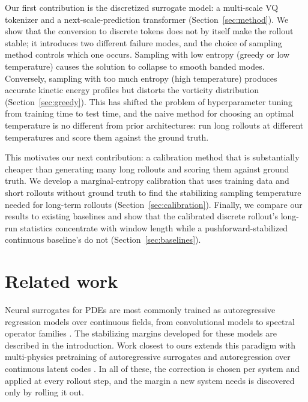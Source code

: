 \documentclass{article}
\begin{document}
Our first contribution is the discretized surrogate model: a multi-scale VQ tokenizer and a next-scale-prediction transformer (Section~\ref{sec:method}).
We show that the conversion to discrete tokens does not by itself make the rollout stable; it introduces two different failure modes, and the choice of sampling method controls which one occurs.
Sampling with low entropy (greedy or low temperature) causes the solution to collapse to smooth banded modes. Conversely, sampling with too much entropy (high temperature) 
produces accurate kinetic energy profiles but distorts the vorticity distribution (Section~\ref{sec:greedy}). This has shifted the problem of hyperparameter tuning from training time to test time, 
and the naive method for choosing an optimal temperature is no different from prior architectures: run long rollouts at different temperatures and score them against the ground truth.

This motivates our next contribution: a calibration method that is substantially cheaper than generating many long rollouts and scoring them against ground truth. We develop 
a marginal-entropy calibration that uses training data and short rollouts without ground truth to find the stabilizing sampling temperature needed for long-term rollouts 
(Section~\ref{sec:calibration}). Finally, we compare our results to existing baselines and show that the calibrated discrete rollout's long-run statistics concentrate with window length while
a pushforward-stabilized continuous baseline's do not (Section~\ref{sec:baselines}).


\section{Related work}
\label{sec:related}


Neural surrogates for PDEs are most commonly trained as autoregressive regression models
over continuous fields, from convolutional models to spectral operator families
\citep{kochkov2021machine,li2021fourier}. The stabilizing margins developed for these
models are described in the introduction. Work closest to ours extends this paradigm with multi-physics pretraining of autoregressive surrogates
\citep{mccabe2024mpp} and autoregression over continuous latent codes
\citep{serrano2024aroma}. In all of these, the correction is chosen per system and applied
at every rollout step, and the margin a new system needs is discovered only by rolling it
out.
\end{document}

